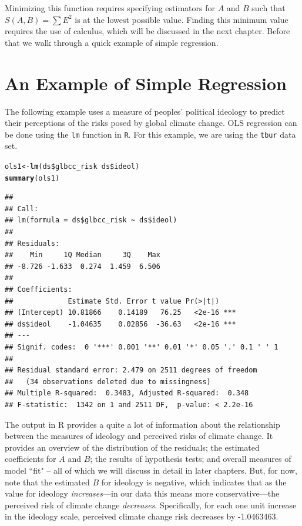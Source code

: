 \documentclass[11pt,openany]{book}\usepackage[]{graphicx}\usepackage[]{color}
\makeatletter
\newcommand{\hlopt}[1]{\textcolor[rgb]{0,0,0}{#1}}%
\newcommand{\hlstd}[1]{\textcolor[rgb]{0.345,0.345,0.345}{#1}}%
\newcommand{\hlkwb}[1]{\textcolor[rgb]{0.69,0.353,0.396}{#1}}%
\newcommand{\hlkwd}[1]{\textcolor[rgb]{0.737,0.353,0.396}{\textbf{#1}}}%
\newenvironment{kframe}{%
 \def\at@end@of@kframe{}%
 \ifinner\ifhmode%
  \def\at@end@of@kframe{\end{minipage}}%
  \begin{minipage}{\columnwidth}%
 \fi\fi%
 \def\FrameCommand##1{\hskip\@totalleftmargin \hskip-\fboxsep
 \colorbox{shadecolor}{##1}\hskip-\fboxsep
     \hskip-\linewidth \hskip-\@totalleftmargin \hskip\columnwidth}%
 \MakeFramed {\advance\hsize-\width
   \@totalleftmargin\z@ \linewidth\hsize
   \@setminipage}}%
 {\par\unskip\endMakeFramed%
 \at@end@of@kframe}
\newenvironment{knitrout}{}{} %
\renewenvironment{knitrout}{\begin{singlespace}}{\end{singlespace}}
\makeatother
\begin{document}
Minimizing this function requires specifying estimators for $A$ and $B$ such that $S(A,B)=\sum E^{2}$ is at the lowest possible value. Finding this minimum value requires the use of calculus, which will be discussed in the next chapter. Before that we walk through a quick example of simple regression.  

\section{An Example of Simple Regression} 

The following example uses a measure of peoples' political ideology to predict their perceptions of the risks posed by global climate change. OLS regression can be done using the \texttt{lm} function in \texttt{R}. For this example, we are using the \texttt{tbur} data set. 

\begin{knitrout}
\color{fgcolor}\begin{kframe}
\begin{alltt}
\hlstd{ols1} \hlkwb{<-} \hlkwd{lm}\hlstd{(ds}\hlopt{\$}\hlstd{glbcc_risk} \hlopt{~} \hlstd{ds}\hlopt{\$}\hlstd{ideol)}
\hlkwd{summary}\hlstd{(ols1)}
\end{alltt}
\begin{verbatim}
## 
## Call:
## lm(formula = ds$glbcc_risk ~ ds$ideol)
## 
## Residuals:
##    Min     1Q Median     3Q    Max 
## -8.726 -1.633  0.274  1.459  6.506 
## 
## Coefficients:
##             Estimate Std. Error t value Pr(>|t|)    
## (Intercept) 10.81866    0.14189   76.25   <2e-16 ***
## ds$ideol    -1.04635    0.02856  -36.63   <2e-16 ***
## ---
## Signif. codes:  0 '***' 0.001 '**' 0.01 '*' 0.05 '.' 0.1 ' ' 1
## 
## Residual standard error: 2.479 on 2511 degrees of freedom
##   (34 observations deleted due to missingness)
## Multiple R-squared:  0.3483,	Adjusted R-squared:  0.348 
## F-statistic:  1342 on 1 and 2511 DF,  p-value: < 2.2e-16
\end{verbatim}
\end{kframe}
\end{knitrout}

The output in R provides a quite a lot of information about the relationship between the measures of ideology and perceived risks of climate change. It provides an overview of the distribution of the residuals; the estimated coefficients for $A$ and $B$; the results of hypothesis tests; and overall measures of model ``fit" -- all of which we will discuss in detail in later chapters. But, for now, note that the estimated $B$ for ideology is negative, which indicates that as the value for ideology \textit{increases}---in our data this means more conservative---the perceived risk of climate change \textit{decreases}. Specifically, for each one unit increase in the ideology scale, perceived climate change risk decreases by -1.0463463.
\end{document}
